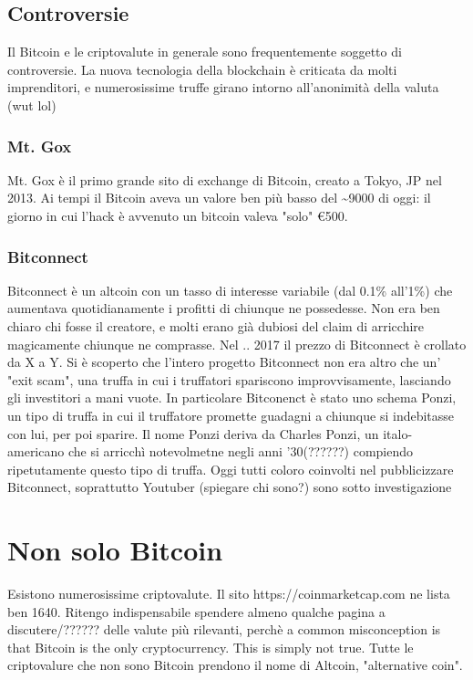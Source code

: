 \documentclass {article}
\begin{document}
\subsection {Controversie}


Il Bitcoin e le criptovalute in generale sono frequentemente soggetto di controversie. La nuova tecnologia della blockchain è criticata da molti imprenditori, e numerosissime truffe girano intorno all'anonimità della valuta (wut lol)


\subsubsection {Mt. Gox}


Mt. Gox è il primo grande sito di exchange di Bitcoin, creato a Tokyo, JP nel 2013.
Ai tempi il Bitcoin aveva un valore ben più basso del \textasciitilde9000 di oggi: il giorno in cui l'hack è avvenuto un bitcoin valeva "solo" \euro{}500.


\subsubsection {Bitconnect}


Bitconnect è un altcoin con un tasso di interesse variabile (dal 0.1\% all'1\%) che aumentava quotidianamente i profitti di chiunque ne possedesse.
Non era ben chiaro chi fosse il creatore, e molti erano già dubiosi del claim di arricchire magicamente chiunque ne comprasse.
Nel .. 2017 il prezzo di Bitconnect è crollato da X a Y. Si è scoperto che l'intero progetto Bitconnect non era altro che un' "exit scam", una truffa in cui i truffatori spariscono improvvisamente, lasciando gli investitori a mani vuote.
In particolare Bitconenct è stato uno schema Ponzi, un tipo di truffa in cui il truffatore promette guadagni a chiunque si indebitasse con lui, per poi sparire.
Il nome Ponzi deriva da Charles Ponzi, un italo-americano che si arricchì notevolmetne negli anni '30(??????) compiendo ripetutamente questo tipo di truffa.
Oggi tutti coloro coinvolti nel pubblicizzare Bitconnect, soprattutto Youtuber (spiegare chi sono?) sono sotto investigazione


\section {Non solo Bitcoin}


Esistono numerosissime criptovalute. Il sito https://coinmarketcap.com ne lista ben 1640. Ritengo indispensabile spendere almeno qualche pagina a discutere/?????? delle valute più rilevanti, perchè a common misconception is that Bitcoin is the only cryptocurrency. This is simply not true. Tutte le criptovalure che non sono Bitcoin prendono il nome di Altcoin, "alternative coin".
\end{document}
